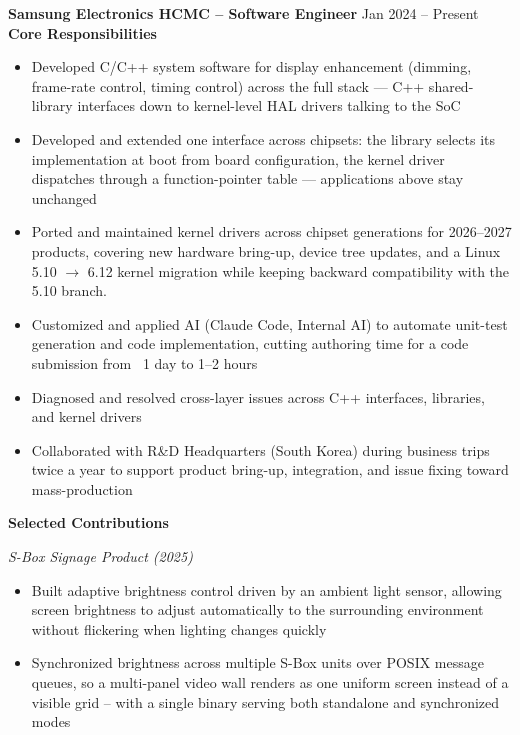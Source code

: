 \documentclass[a4paper,10pt]{article}
\newcommand{\project}[1]{\vspace{2pt}\textit{#1}\vspace{1pt}}
\begin{document}
\textbf{Samsung Electronics HCMC -- Software Engineer} \hfill Jan 2024 -- Present \\[2pt]
\textbf{Core Responsibilities}
\begin{itemize}
\item Developed C/C++ system software for display enhancement (dimming, frame-rate control,
      timing control) across the full stack --- C++ shared-library interfaces down to
      kernel-level HAL drivers talking to the SoC
\item Developed and extended one interface across chipsets: the library
      selects its implementation at boot from board configuration, the kernel driver
      dispatches through a function-pointer table --- applications above stay unchanged
\item Ported and maintained kernel drivers across chipset generations for 2026--2027 products, covering new hardware bring-up, device tree updates, and a Linux 5.10 $\rightarrow$ 6.12 kernel migration while keeping backward compatibility with the 5.10 branch.
\item Customized and applied AI (Claude Code, Internal AI) to automate unit-test generation and code implementation, cutting authoring time for a code submission from ~1 day to 1--2 hours
\item Diagnosed and resolved cross-layer issues across C++ interfaces, libraries, and kernel drivers
\item Collaborated with R\&D Headquarters (South Korea) during business trips twice a year to support product bring-up, integration, and issue fixing toward mass-production
\end{itemize}

\vspace{2pt}
\textbf{Selected Contributions}

\project{S-Box Signage Product (2025)}
\begin{itemize}
    \item Built adaptive brightness control driven by an ambient light sensor, allowing screen
      brightness to adjust automatically to the surrounding environment without flickering
      when lighting changes quickly
    \item Synchronized brightness across multiple S-Box units over POSIX message queues, so a multi-panel video wall renders as one uniform screen instead of a visible grid -- with a single binary serving both standalone and synchronized modes
\end{itemize}
\end{document}
